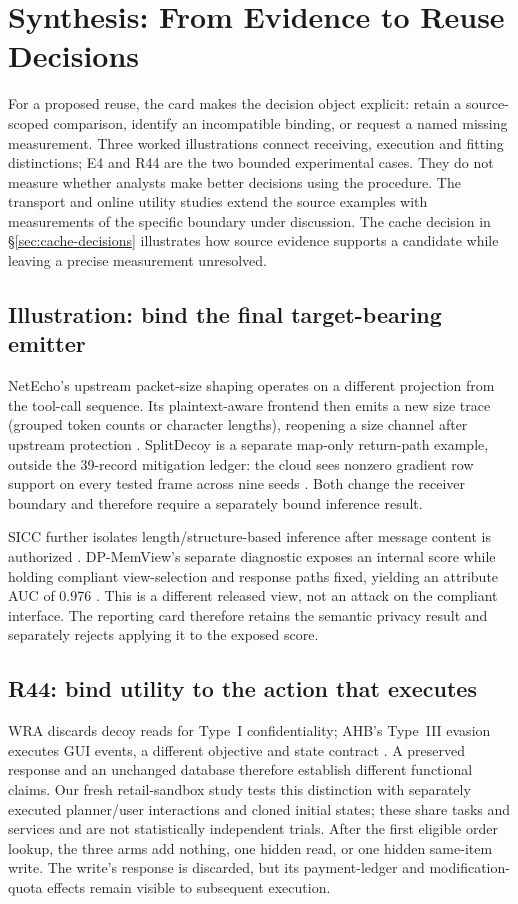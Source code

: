 \section{Synthesis: From Evidence to Reuse Decisions}\label{sec:discussion}

For a proposed reuse, the card makes the decision object explicit: retain a source-scoped comparison, identify an incompatible binding, or request a named missing measurement. Three worked illustrations connect receiving, execution and fitting distinctions; E4 and R44 are the two bounded experimental cases. They do not measure whether analysts make better decisions using the procedure. The transport and online utility studies extend the source examples with measurements of the specific boundary under discussion. The cache decision in \S\ref{sec:cache-decisions} illustrates how source evidence supports a candidate while leaving a precise measurement unresolved.

\subsection{Illustration: bind the final target-bearing emitter}
NetEcho's upstream packet-size shaping operates on a different projection from the tool-call sequence. Its plaintext-aware frontend then emits a new size trace (grouped token counts or character lengths), reopening a size channel after upstream protection \cite{netecho2025}. SplitDecoy is a separate map-only return-path example, outside the 39-record mitigation ledger: the cloud sees nonzero gradient row support on every tested frame across nine seeds \cite[Sections 5.1--5.3]{politis2026splitdecoy}. Both change the receiver boundary and therefore require a separately bound inference result.

SICC further isolates length/structure-based inference after message content is authorized \cite[Table~3]{xu2026sicc}. DP-MemView's separate diagnostic exposes an internal score while holding compliant view-selection and response paths fixed, yielding an attribute AUC of 0.976 \cite[RQ2, following Table~4]{dpmemview2026}. This is a different released view, not an attack on the compliant interface. The reporting card therefore retains the semantic privacy result and separately rejects applying it to the exposed score.

\subsection{R44: bind utility to the action that executes}
WRA discards decoy reads for Type~I confidentiality; AHB's Type~III evasion executes GUI events, a different objective and state contract \cite{jeong2026wra,zhu2026turing}. A preserved response and an unchanged database therefore establish different functional claims. Our fresh retail-sandbox study tests this distinction with separately executed planner/user interactions and cloned initial states; these share tasks and services and are not statistically independent trials. After the first eligible order lookup, the three arms add nothing, one hidden read, or one hidden same-item write. The write's response is discarded, but its payment-ledger and modification-quota effects remain visible to subsequent execution.

